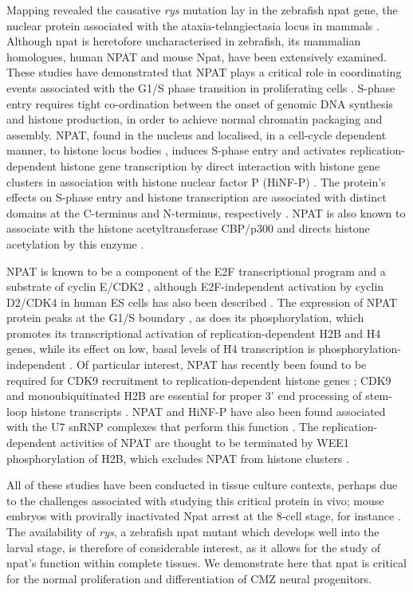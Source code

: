 Mapping revealed the causative \textit{rys} mutation lay in the zebrafish npat gene, the nuclear protein associated with the ataxia-telangiectasia locus in mammals \cite{Imai1996}. Although npat is heretofore uncharacterised in zebrafish, its mammalian homologues, human NPAT and mouse Npat, have been extensively examined. These studies have demonstrated that NPAT plays a critical role in coordinating events associated with the G1/S phase transition in proliferating cells \cite{Ye2003}. S-phase entry requires tight co-ordination between the onset of genomic DNA synthesis and histone production, in order to achieve normal chromatin packaging and assembly. NPAT, found in the nucleus \cite{Sagara2002} and localised, in a cell-cycle dependent manner, to histone locus bodies \cite{Ghule2009}, induces S-phase entry \cite{Zhao1998} and activates replication-dependent histone gene transcription by direct interaction with histone gene clusters \cite{Zhao2000} in association with histone nuclear factor P (HiNF-P) \cite{Mitra2003}. The protein’s effects on S-phase entry and histone transcription are associated with distinct domains at the C-terminus and N-terminus, respectively \cite{Wei2003}. NPAT is also known to associate with the histone acetyltransferase CBP/p300 \cite{Wang2004} and directs histone acetylation by this enzyme \cite{He2011}.

NPAT is known to be a component of the E2F transcriptional program \cite{Gao2003} and a substrate of cyclin E/CDK2 \cite{Zhao1998}, although E2F-independent activation by cyclin D2/CDK4 in human ES cells has also been described \cite{Becker2010}. The expression of NPAT protein peaks at the G1/S boundary \cite{Zhao1998}, as does its phosphorylation, which promotes its transcriptional activation of replication-dependent H2B \cite{Ma2000} and H4 \cite{Mitra2009} genes, while its effect on low, basal levels of H4 transcription is phosphorylation-independent \cite{Ye2003}. Of particular interest, NPAT has recently been found to be required for CDK9 recruitment to replication-dependent histone genes \cite{Pirngruber2010}; CDK9 and monoubiquitinated H2B are essential for proper 3’ end processing of stem-loop histone transcripts \cite{Pirngruber2009}. NPAT and HiNF-P have also been found associated with the U7 snRNP complexes that perform this function \cite{Ghule2009}. The replication-dependent activities of NPAT are thought to be terminated by WEE1 phosphorylation of H2B, which excludes NPAT from histone clusters \cite{Mahajan2012}.

All of these studies have been conducted in tissue culture contexts, perhaps due to the challenges associated with studying this critical protein in vivo; mouse embryos with provirally inactivated Npat arrest at the 8-cell stage, for instance \cite{DiFruscio1997}. The availability of \textit{rys}, a zebrafish npat mutant which develops well into the larval stage, is therefore of considerable interest, as it allows for the study of npat’s function within complete tissues. We demonstrate here that npat is critical for the normal proliferation and differentiation of CMZ neural progenitors.

